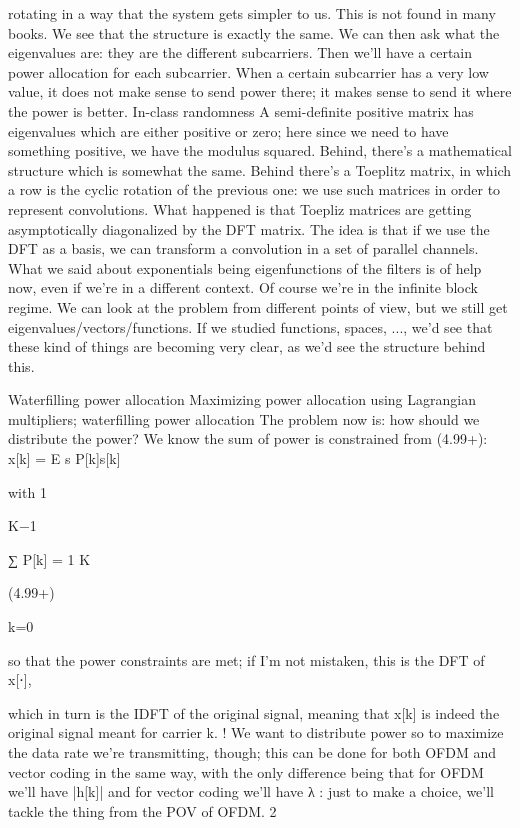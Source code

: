 {{{{{rotating in a way that the system gets simpler to us.
This is not found in many books.
We see that the structure is exactly the same. We can then ask what the eigenvalues are: they are the different subcarriers.
Then we'll have a certain power allocation for each subcarrier. When a certain subcarrier has a very low value, it does not make sense to send power there; it makes sense to send it where the power is better.
In-class randomness A semi-definite positive matrix has eigenvalues which are either positive or zero;
here since we need to have something positive, we have the modulus squared.
Behind, there's a mathematical structure which is somewhat the same.
Behind there's a Toeplitz matrix, in which a row is the cyclic rotation of the previous one: we use such matrices in order to represent convolutions. What happened is that Toepliz matrices are getting asymptotically diagonalized by the DFT matrix. The idea is that if we use the DFT as a basis, we can transform a convolution in a set of parallel channels.
What we said about exponentials being eigenfunctions of the filters is of help now,
even if we're in a different context.
Of course we're in the infinite block regime. We can look at the problem from different points of view, but we still get eigenvalues/vectors/functions.
If we studied functions, spaces, ..., we'd see that these kind of things are becoming very clear, as we'd see the structure behind this.

Waterfilling power allocation Maximizing power allocation using Lagrangian multipliers;
waterfilling power allocation The problem now is: how should we distribute the power? We know the sum of power is constrained from (4.99+):
x[k] = \sqrt E s P[k]s[k]

with 1

K−1

∑ P[k] = 1 K

(4.99+)

k=0

so that the power constraints are met; if I'm not mistaken, this is the DFT of x[⋅],

which in turn is the IDFT of the original signal, meaning that x[k] is indeed the original signal meant for carrier k.
! We want to distribute power so to maximize the data rate we're transmitting, though;
this can be done for both OFDM and vector coding in the same way, with the only difference being that for OFDM we'll have |h[k]| and for vector coding we'll have λ : just to make a choice, we'll tackle the thing from the POV of OFDM.
2

}}}}}
